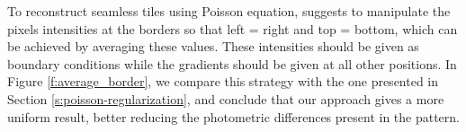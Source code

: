 



To reconstruct seamless tiles using Poisson equation, \citet{perez2003} suggests to manipulate the pixels intensities at the borders so that left = right and top = bottom, which can be achieved by averaging these values. These intensities should be given as boundary conditions while the gradients should be given at all other positions. In Figure \ref{f:average_border},  we compare this strategy with the one presented in Section \ref{s:poisson-regularization}, and conclude that our approach gives a more uniform result, better reducing the photometric differences present in the pattern.

